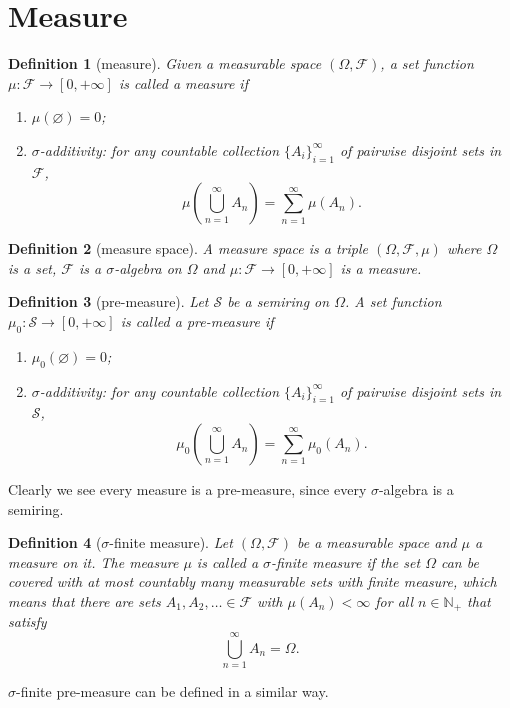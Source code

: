\documentclass{report}
\newtheorem{definition}{Definition}[section]
\theoremstyle{nonumberplain}
\begin{document}
\section{Measure}
\begin{definition}[measure]
	Given a measurable space $(\Omega, \mathcal{F})$, a set function $\mu:\mathcal{F}\to[0,+\infty]$ is called a \emph{measure} if
	\begin{enumerate}
	\item[(a)]$\mu(\varnothing) = 0$;
	\item[(b)]$\sigma$-additivity: for any countable collection $\{A_{i}\}_{i=1}^{\infty }$ of pairwise disjoint sets in $\mathcal{F}$,
	\[
	\mu\left(\bigcup_{n=1}^\infty A_n\right)=\sum_{n=1}^{\infty}\mu(A_n).
	\]
	\end{enumerate}
\end{definition}

\begin{definition}[measure space]
 A \emph{measure space} is a triple $(\Omega,\mathcal{F},\mu)$ where $\Omega$ is a set, $\mathcal{F}$ is a $\sigma$-algebra on $\Omega$ and $\mu:\mathcal{F}\rightarrow[0,+\infty]$ is a measure.
\end{definition} 

\begin{definition}[pre-measure]
	Let $\mathcal{S}$ be a semiring on $\Omega$. A set function $\mu_0:\mathcal{S}\to[0,+\infty]$  is called a \emph{pre-measure} if
	\begin{enumerate}
		\item[(a)]$\mu_0(\varnothing) = 0$;
		\item[(b)]$\sigma$-additivity: for any countable collection $\{A_{i}\}_{i=1}^{\infty }$ of pairwise disjoint sets in $\mathcal{S}$,
		\[
		\mu_0\left(\bigcup_{n=1}^\infty A_n\right)=\sum_{n=1}^{\infty}\mu_0(A_n).
		\]
	\end{enumerate}
\end{definition}

Clearly we see every measure is a pre-measure, since every $\sigma$-algebra is a semiring.

\begin{definition}[$\sigma$-finite measure]
	Let $(\Omega,{\mathcal {F}})$ be a measurable space and $\mu$ a measure on it. The measure $\mu$ is called a $\sigma$-finite measure if the set $\Omega$ can be covered with at most countably many measurable sets with finite measure, which means that there are sets $A_{1},A_{2},\ldots \in {\mathcal {F}}$ with $\mu \left(A_{n}\right)<\infty$ for all $n\in \mathbb {N_+}$ that satisfy 
	\[
	\bigcup_{n=1}^{\infty}A_{n}=\Omega.
	\]
\end{definition}
$\sigma$-finite pre-measure can be defined in a similar way. 
\end{document}
